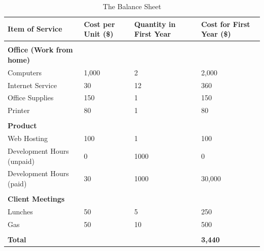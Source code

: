 \begin{table}[ht]
\caption{The Balance Sheet} %
\centering %
\begin{tabular}{| l | p{1in} | p{1in} | p{1in} |} %
\hline
{\bf Item of Service} & {\bf Cost per Unit  (\$)} &  {\bf Quantity in First Year } &  {\bf Cost for First Year (\$) } \\
\hline
 &   &   &   \\
{\bf Office (Work from home)} & & & \\
	Computers & 1,000 & 2 & 2,000 \\
	Internet Service & 30 & 12 & 360 \\
	Office Supplies & 150 & 1 & 150 \\
	Printer & 80 & 1 & 80 \\
 &   &   &   \\
{\bf Product} &   &   &   \\
	Web Hosting & 100 & 1 & 100 \\
	Development Hours (unpaid) & 0 & 1000 & 0 \\
	Development Hours (paid) & 30 & 1000 & 30,000 \\
  &   &   &   \\
{\bf Client Meetings} &   &   &   \\
	Lunches & 50 &  5 & 250\\
	Gas & 50 & 10 & 500 \\
 &   &  &   \\ 
{\bf Total} &   &   & {\bf 3,440} \\
\hline
\end{tabular}
\label{balanceSheet} %
\end{table}

